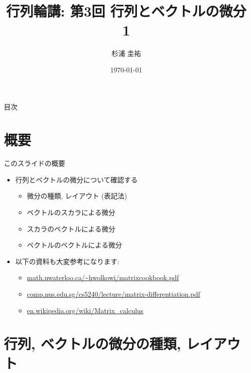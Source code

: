 \documentclass[dvipdfmx,notheorems,t]{beamer}
\title{行列輪講: 第3回 行列とベクトルの微分1}
\author{杉浦 圭祐}
\institute[松谷研究室]{慶應義塾大学理工学部情報工学科 松谷研究室}
\date{\today}
\begin{document}
\linespread{1.1}

\frame{\titlepage}

\section{}

\begin{frame}{目次}
\tableofcontents
\end{frame}

\section{概要}

\begin{frame}{このスライドの概要}
\begin{itemize}
  \item 行列とベクトルの微分について確認する
  \begin{itemize}
    \item 微分の種類, レイアウト (表記法)
    \item ベクトルのスカラによる微分
    \item スカラのベクトルによる微分
    \item ベクトルのベクトルによる微分
  \end{itemize}
  \item 以下の資料も大変参考になります:
  \begin{itemize}
    \item \url{math.uwaterloo.ca/~hwolkowi/matrixcookbook.pdf}
    \item \url{comp.nus.edu.sg/cs5240/lecture/matrix-differentiation.pdf}
    \item \url{en.wikipedia.org/wiki/Matrix_calculus}
  \end{itemize}
\end{itemize}
\end{frame}

\section{行列, ベクトルの微分の種類, レイアウト}
\end{document}
